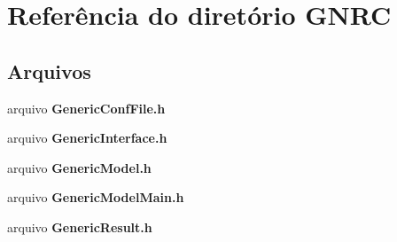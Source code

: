 \section{Referência do diretório G\+N\+RC}
\label{dir_1482de5b271ec72e7326d859306134f0}
\subsection*{Arquivos}
\begin{DoxyCompactItemize}
\item 
arquivo {\bf Generic\+Conf\+File.\+h}
\item 
arquivo {\bf Generic\+Interface.\+h}
\item 
arquivo {\bf Generic\+Model.\+h}
\item 
arquivo {\bf Generic\+Model\+Main.\+h}
\item 
arquivo {\bf Generic\+Result.\+h}
\end{DoxyCompactItemize}
